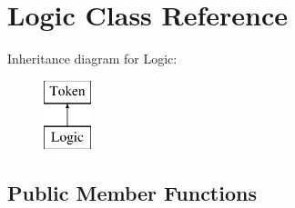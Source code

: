 \hypertarget{class_logic}{}\section{Logic Class Reference}
\label{class_logic}
Inheritance diagram for Logic\+:\begin{figure}[H]
\begin{center}
\leavevmode
\includegraphics[height=2.000000cm]{class_logic}
\end{center}
\end{figure}
\subsection*{Public Member Functions}
